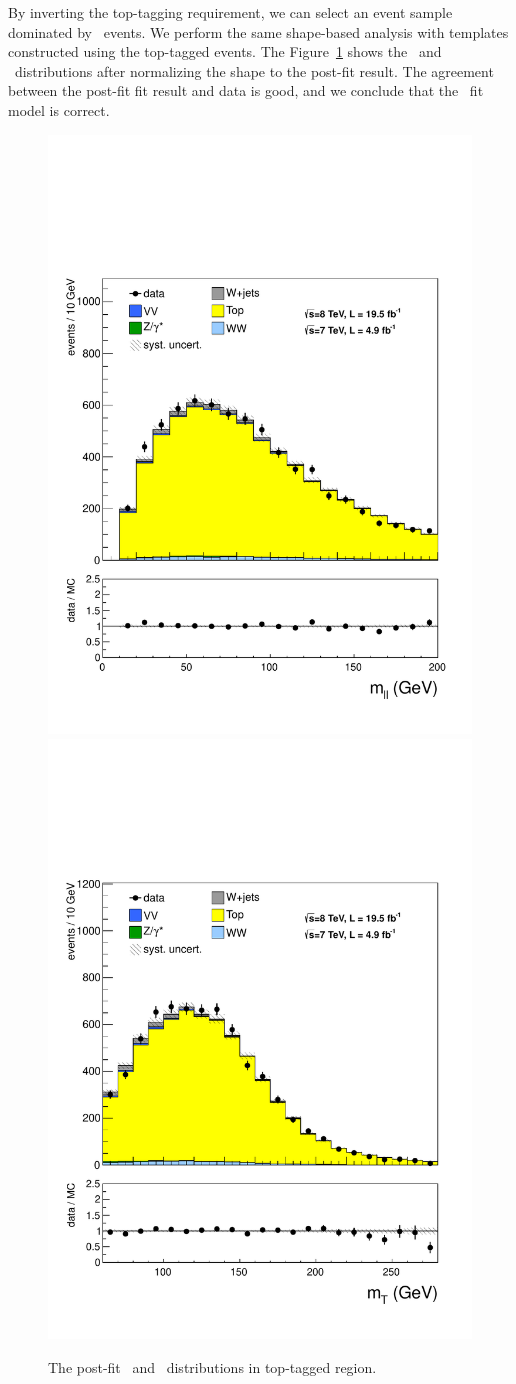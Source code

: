 By inverting the top-tagging requirement, we can select an event sample 
dominated by \topbkg\ events. We perform the same shape-based analysis 
with templates constructed using the top-tagged events. 
The Figure~\ref{fig:topCRfit} shows the \mll\ and \mT\ distributions 
after normalizing the shape to the post-fit result. The agreement 
between the post-fit fit result and data is good, and we conclude 
that the \topbkg\ fit model is correct. 

\begin{figure}[!hbtp] 
\begin{center}
    \includegraphics[width=.47\textwidth]{figures/Top_mll_1j.pdf}
    \includegraphics[width=.47\textwidth]{figures/Top_mT_1j.pdf}
    \caption{The post-fit \mll\ and \mT\ distributions in top-tagged region.} 
    \label{fig:topCRfit}
\end{center}
\end{figure}


